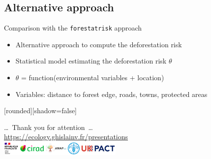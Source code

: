 \documentclass[10pt,table,dvipsnames,compress]{beamer}
\begin{document}
\subsection{Alternative approach}
\label{sec:org7b5317d}

\begin{frame}[label={sec:org407cecd},fragile]{Comparison with the \texttt{forestatrisk} approach}
 \begin{itemize}
\item Alternative approach to compute the deforestation risk
\item Statistical model estimating the deforestation risk \(\theta\)
\item \(\theta\) = function(environmental variables + location)
\item Variables: distance to forest edge, roads, towns, protected areas
\end{itemize}
\end{frame}


{
  [rounded][shadow=false]
  \begin{frame}[plain]
    \begin{block}{}
      \begin{center}
        \ldots~Thank you for attention~\ldots \\
        \url{https://ecology.ghislainv.fr/presentations} \\
        \includegraphics[width=0.45\textwidth]{figs/partners_logos}
      \end{center}
    \end{block}
  \end{frame}
}
\end{document}
